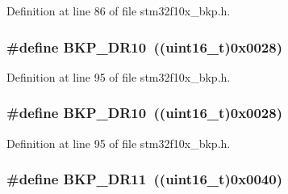 Definition at line 86 of file stm32f10x\+\_\+bkp.\+h.

\subsubsection[{\texorpdfstring{B\+K\+P\+\_\+\+D\+R10}{BKP_DR10}}]{\setlength{\rightskip}{0pt plus 5cm}\#define B\+K\+P\+\_\+\+D\+R10~(({\bf uint16\+\_\+t})0x0028)}\hypertarget{group___data___backup___register_ga82bb6da0b7a29a737b2d2b03c0561260}{}\label{group___data___backup___register_ga82bb6da0b7a29a737b2d2b03c0561260}


Definition at line 95 of file stm32f10x\+\_\+bkp.\+h.

\subsubsection[{\texorpdfstring{B\+K\+P\+\_\+\+D\+R10}{BKP_DR10}}]{\setlength{\rightskip}{0pt plus 5cm}\#define B\+K\+P\+\_\+\+D\+R10~(({\bf uint16\+\_\+t})0x0028)}\hypertarget{group___data___backup___register_ga82bb6da0b7a29a737b2d2b03c0561260}{}\label{group___data___backup___register_ga82bb6da0b7a29a737b2d2b03c0561260}


Definition at line 95 of file stm32f10x\+\_\+bkp.\+h.

\subsubsection[{\texorpdfstring{B\+K\+P\+\_\+\+D\+R11}{BKP_DR11}}]{\setlength{\rightskip}{0pt plus 5cm}\#define B\+K\+P\+\_\+\+D\+R11~(({\bf uint16\+\_\+t})0x0040)}\hypertarget{group___data___backup___register_ga7784d76b7357c12fcc2dce349b3d7b6f}{}\label{group___data___backup___register_ga7784d76b7357c12fcc2dce349b3d7b6f}


